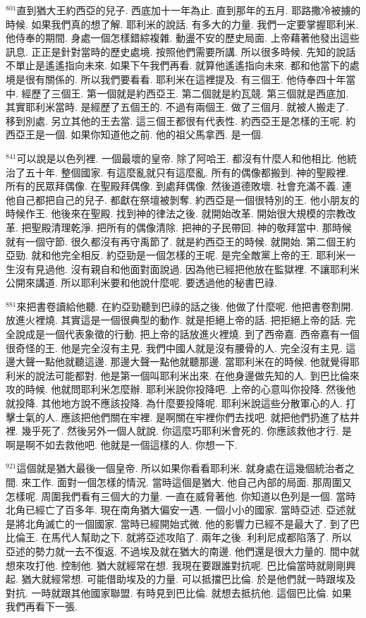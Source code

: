 \documentclass{book}
\begin{document}
$^{801}$直到猶大王約西亞的兒子.
西底加十一年為止.
直到那年的五月.
耶路撒冷被擄的時候.
如果我們真的想了解.
耶利米的說話.
有多大的力量.
我們一定要掌握耶利米.
他侍奉的期間.
身處一個怎樣錯綜複雜.
動盪不安的歷史局面.
上帝藉著他發出這些訊息.
正正是針對當時的歷史處境.
按照他們需要所講.
所以很多時候.
先知的說話不單止是遙遙指向未來.
如果下午我們再看.
就算他遙遙指向未來.
都和他當下的處境是很有關係的.
所以我們要看看.
耶利米在這裡提及.
有三個王.
他侍奉四十年當中.
經歷了三個王.
第一個就是約西亞王.
第二個就是約瓦競.
第三個就是西底加.
其實耶利米當時.
是經歷了五個王的.
不過有兩個王.
做了三個月.
就被人搬走了.
移到別處.
另立其他的王去當.
這三個王都很有代表性.
約西亞王是怎樣的王呢.
約西亞王是一個.
如果你知道他之前.
他的祖父馬拿西.
是一個.

$^{841}$可以說是以色列裡.
一個最壞的皇帝.
除了阿哈王.
都沒有什麼人和他相比.
他統治了五十年.
整個國家.
有這麼亂就只有這麼亂.
所有的偶像都搬到.
神的聖殿裡.
所有的民眾拜偶像.
在聖殿拜偶像.
到處拜偶像.
然後道德敗壞.
社會充滿不義.
連他自己都把自己的兒子.
都獻在祭壇被剝奪.
約西亞是一個很特別的王.
他小朋友的時候作王.
他後來在聖殿.
找到神的律法之後.
就開始改革.
開始很大規模的宗教改革.
把聖殿清理乾淨.
把所有的偶像清除.
把神的子民帶回.
神的敬拜當中.
那時候就有一個守節.
很久都沒有再守禹節了.
就是約西亞王的時候.
就開始.
第二個王約亞勁.
就和他完全相反.
約亞勁是一個怎樣的王呢.
是完全敵黨上帝的王.
耶利米一生沒有見過他.
沒有親自和他面對面說過.
因為他已經把他放在監獄裡.
不讓耶利米公開來講道.
所以耶利米要和他說什麼呢.
要透過他的秘書巴祿.

$^{881}$來把書卷讀給他聽.
在約亞勁聽到巴祿的話之後.
他做了什麼呢.
他把書卷割開.
放進火裡燒.
其實這是一個很典型的動作.
就是拒絕上帝的話.
把拒絕上帝的話.
完全說成是一個代表象徵的行動.
把上帝的話放進火裡燒.
到了西帝嘉.
西帝嘉有一個很奇怪的王.
他是完全沒有主見.
我們中國人就是沒有腰骨的人.
完全沒有主見.
這邊大聲一點他就聽這邊.
那邊大聲一點他就聽那邊.
當耶利米在的時候.
他就覺得耶利米的說法可能都對.
他是第一個叫耶利米出來.
在他身邊做先知的人.
到巴比倫來攻的時候.
他就問耶利米怎麼辦.
耶利米說你投降吧.
上帝的心意叫你投降.
然後他就投降.
其他地方說不應該投降.
為什麼要投降呢.
耶利米說這些分散軍心的人.
打擊士氣的人.
應該把他們關在牢裡.
是啊關在牢裡你們去找吧.
就把他們扔進了枯井裡.
幾乎死了.
然後另外一個人就說.
你這麼巧耶利米會死的.
你應該救他才行.
是啊是啊不如去救他吧.
他就是一個這樣的人.
你想一下.

$^{921}$這個就是猶大最後一個皇帝.
所以如果你看看耶利米.
就身處在這幾個統治者之間.
來工作.
面對一個怎樣的情況.
當時這個是猶大.
他自己內部的局面.
那周圍又怎樣呢.
周圍我們看有三個大的力量.
一直在威脅著他.
你知道以色列是一個.
當時北角已經亡了百多年.
現在南角猶大偏安一遇.
一個小小的國家.
當時亞述.
亞述就是將北角滅亡的一個國家.
當時已經開始式微.
他的影響力已經不是最大了.
到了巴比倫王.
在馬代人幫助之下.
就將亞述攻陷了.
兩年之後.
利利尼成都陷落了.
所以亞述的勢力就一去不復返.
不過埃及就在猶大的南邊.
他們還是很大力量的.
間中就想來攻打他.
控制他.
猶大就經常在想.
我現在要跟誰對抗呢.
巴比倫當時就剛剛興起.
猶大就經常想.
可能借助埃及的力量.
可以抵擋巴比倫.
於是他們就一時跟埃及對抗.
一時就跟其他國家聯盟.
有時見到巴比倫.
就想去抵抗他.
這個巴比倫.
如果我們再看下一張.
\end{document}
